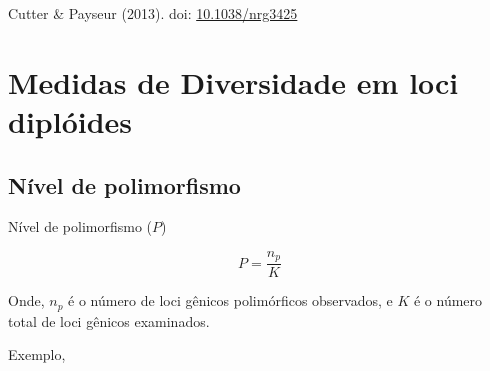 \documentclass[
]{book}
\begin{document}
Cutter \& Payseur (2013). doi: \href{https://doi.org/10.1038/nrg3425}{10.1038/nrg3425}

\hypertarget{medidas-de-diversidade-em-loci-dipluxf3ides}{%
\section{Medidas de Diversidade em loci diplóides}\label{medidas-de-diversidade-em-loci-dipluxf3ides}}

\hypertarget{nuxedvel-de-polimorfismo}{%
\subsection{Nível de polimorfismo}\label{nuxedvel-de-polimorfismo}}

Nível de polimorfismo (\(P\))

\begin{equation} 
P = \frac{n_p}{K}
  \label{eq:polimorfism}
\end{equation}

Onde,
\(n_p\) é o número de loci gênicos polimórficos observados, e
\(K\) é o número total de loci gênicos examinados.

Exemplo,
\end{document}

